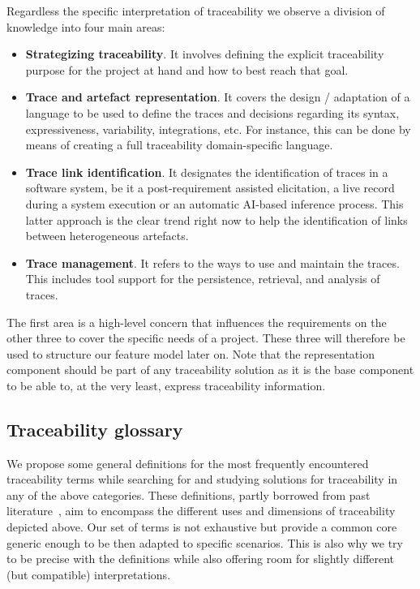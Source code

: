 Regardless the specific interpretation of traceability we observe a division of knowledge into four main areas: %
\begin{itemize}
	\item \textbf{Strategizing traceability}. It involves defining the explicit traceability purpose for the project at hand and how to best reach that goal. 
	\item \textbf{Trace and artefact representation}. It covers the design / adaptation of a language to be used to define the traces and decisions regarding its syntax, expressiveness, variability, integrations, etc. For instance, this can be done by means of creating a full traceability domain-specific language. %
	\item \textbf{Trace link identification}. It designates the identification of traces in a software system, be it a post-requirement assisted elicitation, a live record during a system execution or an automatic AI-based inference process. This latter approach is the clear trend right now to help the identification of links between heterogeneous artefacts.
	\item \textbf{Trace management}. It refers to the ways to use and maintain the traces. This includes tool support for the persistence, retrieval, and analysis of traces. 
\end{itemize}

The first area is a high-level concern that influences the requirements on the other three to cover the specific needs of a project. These three will therefore be used to structure our feature model later on. Note that the representation component should be part of any traceability solution as it is the base component to be able to, at the very least, express traceability information. 

\subsection{Traceability glossary}
We propose some general definitions for the most frequently encountered traceability terms while searching for and studying solutions for traceability in any of the above categories. These definitions, partly borrowed from past literature~\cite{Gotel2012}, aim to encompass the different uses and dimensions of traceability depicted above. Our set of terms is not exhaustive but provide a common core generic enough to be then adapted to specific scenarios. This is also why we try to be precise with the definitions while also offering room for slightly different (but compatible) interpretations. %

